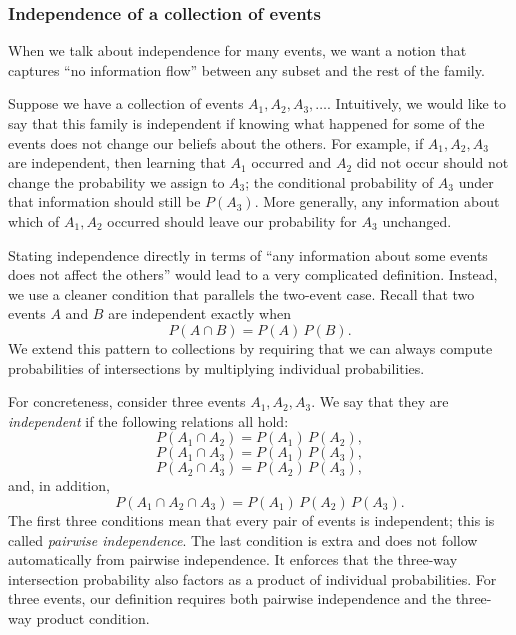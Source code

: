 \subsubsection{Independence of a collection of events}

When we talk about independence for many events, we want a notion that captures “no information flow” between any subset and the rest of the family.

Suppose we have a collection of events \(A_1, A_2, A_3, \dots\). Intuitively, we would like to say that this family is independent if knowing what happened for some of the events does not change our beliefs about the others. For example, if \(A_1, A_2, A_3\) are independent, then learning that \(A_1\) occurred and \(A_2\) did not occur should not change the probability we assign to \(A_3\); the conditional probability of \(A_3\) under that information should still be \(P(A_3)\). More generally, any information about which of \(A_1, A_2\) occurred should leave our probability for \(A_3\) unchanged.

Stating independence directly in terms of “any information about some events does not affect the others” would lead to a very complicated definition. Instead, we use a cleaner condition that parallels the two-event case. Recall that two events \(A\) and \(B\) are independent exactly when
\[
P(A \cap B) = P(A)\,P(B).
\]
We extend this pattern to collections by requiring that we can always compute probabilities of intersections by multiplying individual probabilities.

For concreteness, consider three events \(A_1, A_2, A_3\). We say that they are \textit{independent} if the following relations all hold:
\[
P(A_1 \cap A_2) = P(A_1)\,P(A_2),
\]
\[
P(A_1 \cap A_3) = P(A_1)\,P(A_3),
\]
\[
P(A_2 \cap A_3) = P(A_2)\,P(A_3),
\]
and, in addition,
\[
P(A_1 \cap A_2 \cap A_3) = P(A_1)\,P(A_2)\,P(A_3).
\]
The first three conditions mean that every pair of events is independent; this is called \textit{pairwise independence}. The last condition is extra and does not follow automatically from pairwise independence. It enforces that the three-way intersection probability also factors as a product of individual probabilities. For three events, our definition requires both pairwise independence and the three-way product condition.

